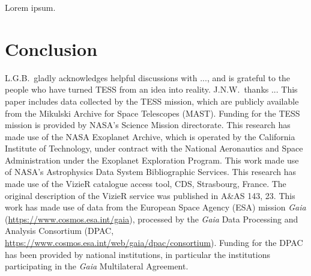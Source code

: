 \documentclass[12pt,twocolumn,tighten]{aastex62}
\begin{document}
Lorem ipsum.

\section{Conclusion}
\label{sec:conclusion}





\acknowledgements
L.G.B.\ gladly acknowledges helpful discussions with
..., and is
grateful to the people who have turned TESS from an idea into reality.
%
J.N.W.\ thanks ...
%
This paper includes data collected by the TESS mission, which are
publicly available from the Mikulski Archive for Space Telescopes
(MAST).
%
Funding for the TESS mission is provided by NASA's Science Mission
directorate.
%
This research has made use of the NASA Exoplanet Archive, which is
operated by the California Institute of Technology, under contract
with the National Aeronautics and Space Administration under the
Exoplanet Exploration Program.
%
This work made use of NASA's Astrophysics Data System Bibliographic
Services.
%
This research has made use of the VizieR catalogue access tool, CDS,
Strasbourg, France. The original description of the VizieR service was
published in A\&AS 143, 23.
%
This work has made use of data from the European Space Agency (ESA)
mission {\it Gaia} (\url{https://www.cosmos.esa.int/gaia}), processed
by the {\it Gaia} Data Processing and Analysis Consortium (DPAC,
\url{https://www.cosmos.esa.int/web/gaia/dpac/consortium}). Funding
for the DPAC has been provided by national institutions, in particular
the institutions participating in the {\it Gaia} Multilateral
Agreement.
%
\newline
%
%

                            
 

\end{document}
